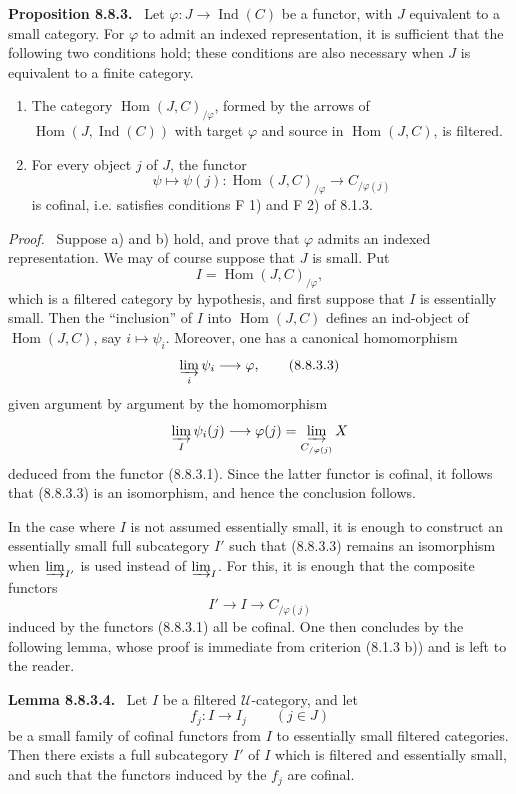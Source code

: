 \documentclass[11pt]{article}
\newcommand{\U}{\mathcal{U}}
\newcommand{\Ind}{\operatorname{Ind}}
\newcommand{\Hhom}{\operatorname{Hom}}
\newenvironment{statement}[1]{\par\medskip\noindent\textbf{#1.}\ }{\par\medskip}
\newenvironment{proofsketch}{\par\noindent\emph{Proof.}\ }{\par\medskip}
\begin{document}
\begin{statement}{Proposition 8.8.3}
Let $\varphi:J\to\Ind(C)$ be a functor, with $J$ equivalent to a small category. For $\varphi$ to admit an indexed representation, it is sufficient that the following two conditions hold; these conditions are also necessary when $J$ is equivalent to a finite category.
\begin{enumerate}[label=\alph*)]
\item The category $\Hhom(J,C)_{/\varphi}$, formed by the arrows of $\Hhom(J,\Ind(C))$ with target $\varphi$ and source in $\Hhom(J,C)$, is filtered.
\item For every object $j$ of $J$, the functor
\[
 \psi\longmapsto \psi(j):
 \Hhom(J,C)_{/\varphi}\longrightarrow C_{/\varphi(j)}
\tag{8.8.3.1}
\]
is cofinal, i.e. satisfies conditions F 1) and F 2) of 8.1.3.
\end{enumerate}
\end{statement}

\begin{proofsketch}
Suppose a) and b) hold, and prove that $\varphi$ admits an indexed representation. We may of course suppose that $J$ is small. Put
\[
 I=\Hhom(J,C)_{/\varphi},
\tag{8.8.3.2}
\]
which is a filtered category by hypothesis, and first suppose that $I$ is essentially small. Then the ``inclusion'' of $I$ into $\Hhom(J,C)$ defines an ind-object of $\Hhom(J,C)$, say $i\mapsto\psi_i$. Moreover, one has a canonical homomorphism
\[
 \varinjlim_i\psi_i\longrightarrow \varphi,
\tag{8.8.3.3}
\]
given argument by argument by the homomorphism
\[
 \varinjlim_I\psi_i(j)\longrightarrow
 \varphi(j)=\varinjlim_{C_{/\varphi(j)}}X
\]
deduced from the functor (8.8.3.1). Since the latter functor is cofinal, it follows that (8.8.3.3) is an isomorphism, and hence the conclusion follows.

In the case where $I$ is not assumed essentially small, it is enough to construct an essentially small full subcategory $I'$ such that (8.8.3.3) remains an isomorphism when $\varinjlim_{I'}$ is used instead of $\varinjlim_I$. For this, it is enough that the composite functors
\[
 I'\longrightarrow I\longrightarrow C_{/\varphi(j)}
\]
induced by the functors (8.8.3.1) all be cofinal. One then concludes by the following lemma, whose proof is immediate from criterion (8.1.3 b)) and is left to the reader.
\end{proofsketch}

\begin{statement}{Lemma 8.8.3.4}
Let $I$ be a filtered $\U$-category, and let
\[
 f_j:I\longrightarrow I_j \qquad (j\in J)
\]
be a small family of cofinal functors from $I$ to essentially small filtered categories. Then there exists a full subcategory $I'$ of $I$ which is filtered and essentially small, and such that the functors induced by the $f_j$ are cofinal.
\end{statement}
\end{document}
